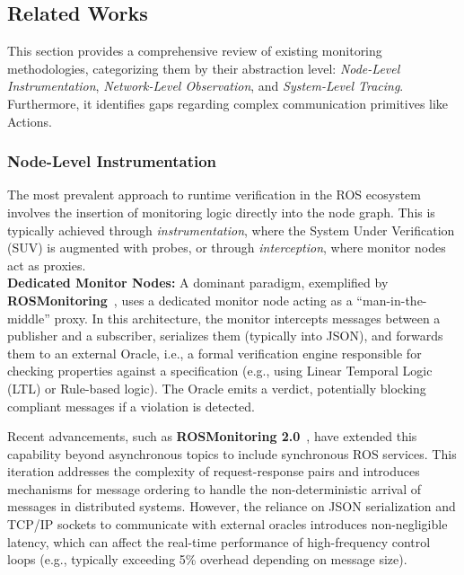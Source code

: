 \subsection{Related Works}
This section provides a comprehensive review of existing monitoring methodologies, categorizing them by their abstraction level: \textit{Node-Level Instrumentation}, \textit{Network-Level Observation}, and \textit{System-Level Tracing}. Furthermore, it identifies gaps regarding complex communication primitives like Actions.

\subsubsection{Node-Level Instrumentation}

The most prevalent approach to runtime verification in the ROS ecosystem involves the insertion of monitoring logic directly into the node graph. This is typically achieved through \textit{instrumentation}, where the System Under Verification (SUV) is augmented with probes, or through \textit{interception}, where monitor nodes act as proxies.\\

\textbf{Dedicated Monitor Nodes:} A dominant paradigm, exemplified by \textbf{ROSMonitoring}~\cite{ferrando2020rosmonitoring}, uses a dedicated monitor node acting as a ``man-in-the-middle'' proxy. In this architecture, the monitor intercepts messages between a publisher and a subscriber, serializes them (typically into JSON), and forwards them to an external Oracle, i.e., a formal verification engine responsible for checking properties against a specification (e.g., using Linear Temporal Logic (LTL) or Rule-based logic). The Oracle emits a verdict, potentially blocking compliant messages if a violation is detected.

Recent advancements, such as \textbf{ROSMonitoring 2.0}~\cite{saadat2024rosmonitoring2}, have extended this capability beyond asynchronous topics to include synchronous ROS services. This iteration addresses the complexity of request-response pairs and introduces mechanisms for message ordering to handle the non-deterministic arrival of messages in distributed systems. However, the reliance on JSON serialization and TCP/IP sockets to communicate with external oracles introduces non-negligible latency, which can affect the real-time performance of high-frequency control loops (e.g., typically exceeding 5\% overhead depending on message size). \\

